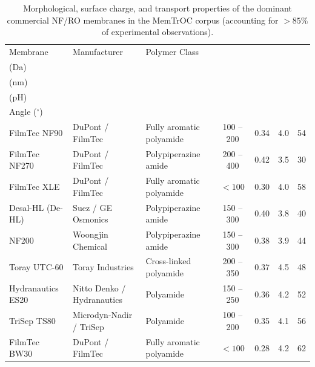 \documentclass[11pt]{article}
\begin{document}
\begin{table}[H]
\centering
\small
\setlength{\tabcolsep}{3.5pt}
\renewcommand{\arraystretch}{0.92}
\caption{Morphological, surface charge, and transport properties of the dominant commercial NF/RO membranes in the MemTrOC corpus (accounting for $>85\%$ of experimental observations).}
\label{tab:s2_membranes}
\begin{tabularx}{\textwidth}{>{\raggedright\arraybackslash}p{2.6cm} >{\raggedright\arraybackslash}p{2.8cm} >{\raggedright\arraybackslash}X c c c c}
\toprule
Membrane & Manufacturer & Polymer Class & \begin{tabular}{@{}c@{}}MWCO\\(Da)\end{tabular} & \begin{tabular}{@{}c@{}}$r_p$\\(nm)\end{tabular} & \begin{tabular}{@{}c@{}}IEP\\(pH)\end{tabular} & \begin{tabular}{@{}c@{}}Contact\\Angle ($^\circ$)\end{tabular} \\
\midrule
FilmTec NF90     & DuPont / FilmTec           & Fully aromatic polyamide    & 100 -- 200 & 0.34 & 4.0 & 54 \\
FilmTec NF270    & DuPont / FilmTec           & Polypiperazine amide        & 200 -- 400 & 0.42 & 3.5 & 30 \\
FilmTec XLE      & DuPont / FilmTec           & Fully aromatic polyamide    & $<100$     & 0.30 & 4.0 & 58 \\
Desal-HL (De-HL) & Suez / GE Osmonics         & Polypiperazine amide        & 150 -- 300 & 0.40 & 3.8 & 40 \\
NF200            & Woongjin Chemical          & Polypiperazine amide        & 150 -- 300 & 0.38 & 3.9 & 44 \\
Toray UTC-60     & Toray Industries           & Cross-linked polyamide      & 200 -- 350 & 0.37 & 4.5 & 48 \\
Hydranautics ES20& Nitto Denko / Hydranautics & Polyamide                   & 150 -- 250 & 0.36 & 4.2 & 52 \\
TriSep TS80      & Microdyn-Nadir / TriSep    & Polyamide                   & 100 -- 200 & 0.35 & 4.1 & 56 \\
FilmTec BW30     & DuPont / FilmTec           & Fully aromatic polyamide    & $<100$     & 0.28 & 4.2 & 62 \\

\end{tabularx}
\end{table}
\end{document}
